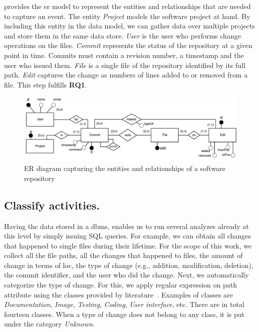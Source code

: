  provides the \gls{er} model to represent the entities and relationships that are needed to capture an event. The entity \textsl{Project} models the software project at hand. By including this entity in the data model, we can gather data over multiple projects and store them in the same data store. \textsl{User} is the user who performs change operations on the files. \textsl{Commit} represents the status of the repository at a given point in time. Commits must contain a revision number, a timestamp and the user who issued them. \textsl{File} is a single file of the repository identified by its full path. \textsl{Edit} captures the change as numbers of lines added to or removed from a file. This step fulfills \textbf{RQ1}.

\begin{figure}[]
    \centering
    \includegraphics[width=\textwidth]{figures/CommitLogER}
    \caption{ER diagram capturing the entities and relationships of a software repository}
    \label{fig:er-diagram}
\end{figure}


\subsection{Classify activities.}

Having the data stored in a \gls{dbms}, enables us to run several analyzes already at this level by simply issuing SQL queries. For example, we can obtain all changes that happened to single files during their lifetime. For the scope of this work, we collect all the file paths, all the changes that happened to files, the amount of change in terms of \gls{loc}, the type of change (e.g., addition, modification, deletion), the commit identifier, and the user who did the change. 
Next, we automatically categorize the type of change. For this, we apply regular expression on path attribute using the classes provided by literature~\cite{DBLP:journals/ese/VasilescuSGM14}. 
Examples of classes are  \textsl{Documentation}, \textsl{Image}, \textsl{Testing}, \textsl{Coding}, \textsl{User interface}, etc. There are in total fourteen classes. When a type of change does not belong to any class, it is put under the category \textsl{Unknown}.

